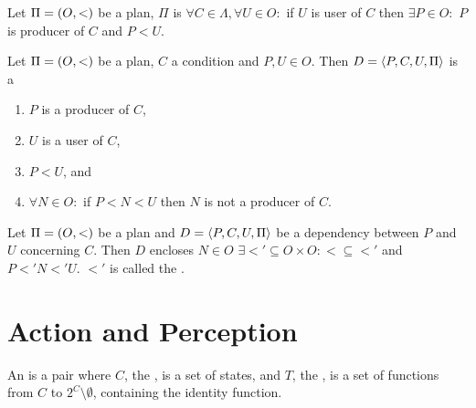 \begin{defi}
Let $\Pi=\left( O,<\right)$ be a plan, $\Pi$ is  \iffTx{} $\forall C\in\Lambda,\forall U\in O:$ if $U$ is user of $C$ then $\exists P\in O:$ $P$ is producer of $C$ and $P<U$.
\cite{conf/ijcai/HertzbergH89}
\end{defi}

\begin{defi}
Let $\Pi=\left( O,<\right)$ be a plan, $C$ a condition and $P,U\in O$. Then $D=\left\langle P,C,U,\Pi\right\rangle$ is a  \iffTx{}
\begin{enumerate}
 \item $P$ is a producer of $C$,
 \item $U$ is a user of $C$,
 \item $P<U$, and
 \item $\forall N\in O:$ if $P<N<U$ then $N$ is not a producer of $C$.
\end{enumerate}
\cite{conf/ijcai/HertzbergH89}
\end{defi}

\begin{defi}
Let $\Pi=\left( O,<\right)$ be a plan and $D=\left\langle P,C,U,\Pi\right\rangle$ be a dependency between $P$ and $U$ concerning $C$. Then $D$ encloses $N\in O$ \iffTx{} $\exists<'\subseteq O\times O:<\subseteq<'$ and $P<'N<'U$. $<'$ is called the .
\cite{conf/ijcai/HertzbergH89}
\end{defi}

\section{Action and Perception}

\begin{defi}
An  is a pair  where $C$, the , is a set of states, and $T$, the , is a set of functions from $C$ to $2^C\setminus\emptyset$, containing the identity function.
\cite{conf/ijcai/BrafmanS95}
\end{defi}

